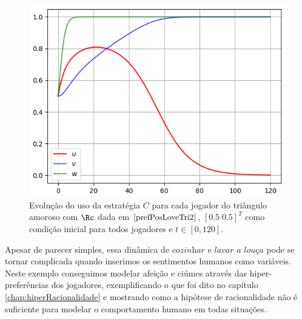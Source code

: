 \begin{figure}[h]
    \caption{Evolução do uso da estratégia $C$ para cada jogador do triângulo amoroso com $\Rc$ dada em $\eqref{prefPosLoveTri2}$,  $[0.5 \; 0.5]^T$ como condição inicial para todos jogadores e $t\in[0,120]$.}
    \centerline{\includegraphics[scale=0.8]{./img/love_tri2.png}}
    \label{fig:love_tri2.png}
\end{figure}

Apesar de parecer simples, essa dinâmica de $\textit{cozinhar}$ e $\textit{lavar a louça}$ pode se tornar complicada quando inserimos os sentimentos humanos como variáveis. Neste exemplo conseguimos modelar afeição e ciúmes através das hiper-preferências dos jogadores, exemplificando o que foi dito no capítulo \ref{chap:hiperRacionalidade} e mostrando como a hipótese de racionalidade não é suficiente para modelar o comportamento humano em todas situações.